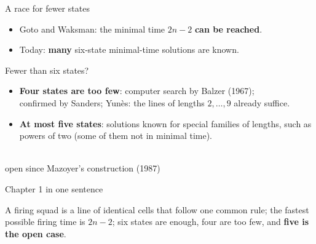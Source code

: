 \begin{frame}{A race for fewer states}
\begin{center}
\end{center}
\vspace{2ex}
\begin{itemize}
\item Goto and Waksman: the minimal time $2n-2$ \textbf{can be reached}.
\item Today: \textbf{many} six-state minimal-time solutions are known.
\end{itemize}
\end{frame}

\begin{frame}{Fewer than six states?}
\begin{itemize}
\item \textbf{Four states are too few}: computer search by Balzer (1967);\\
confirmed by Sanders; Yun\`es: the lines of lengths $2,\dots,9$ already suffice.
\item \textbf{At most five states}: solutions known for special families of lengths, such as powers of two (some of them not in minimal time).
\end{itemize}
\vspace{3ex}
\begin{center}
\\[1.5ex]
{\color{mute} open since Mazoyer's construction (1987)}
\end{center}
\end{frame}

\begin{frame}{Chapter 1 in one sentence}
\vspace{4ex}
\begin{plainbox}\large
A firing squad is a line of identical cells that follow one common rule; the fastest possible firing time is $2n-2$; six states are enough, four are too few, and \textbf{five is the open case}.
\end{plainbox}
\end{frame}

